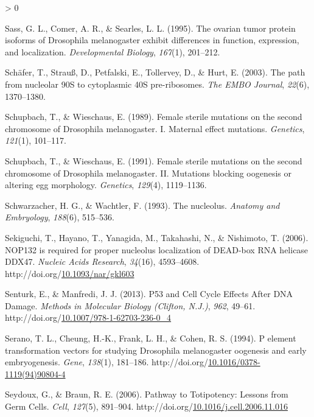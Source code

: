 \documentclass[12pt,oneside]{reedthesis}
\newlength{\cslhangindent}
\newenvironment{CSLReferences}[2] %
 {%
  \setlength{\parindent}{0pt}
  \ifodd #1 \everypar{\setlength{\hangindent}{\cslhangindent}}\ignorespaces\fi
  \ifnum #2 > 0
  \setlength{\parskip}{#2\baselineskip}
  \fi
 }%
 {}
\begin{document}
\begin{CSLReferences}{1}{0}
\leavevmode\hypertarget{ref-Sass1995}{}%
Sass, G. L., Comer, A. R., \& Searles, L. L. (1995). The ovarian tumor protein isoforms of {Drosophila} melanogaster exhibit differences in function, expression, and localization. \emph{Developmental Biology}, \emph{167}(1), 201--212.

\leavevmode\hypertarget{ref-Schafer2003a}{}%
Schäfer, T., Strauß, D., Petfalski, E., Tollervey, D., \& Hurt, E. (2003). The path from nucleolar {90S} to cytoplasmic {40S} pre-ribosomes. \emph{The EMBO Journal}, \emph{22}(6), 1370--1380.

\leavevmode\hypertarget{ref-Schupbach1989c}{}%
Schupbach, T., \& Wieschaus, E. (1989). Female sterile mutations on the second chromosome of {Drosophila} melanogaster. {I}. {Maternal} effect mutations. \emph{Genetics}, \emph{121}(1), 101--117.

\leavevmode\hypertarget{ref-Schupbach1991f}{}%
Schupbach, T., \& Wieschaus, E. (1991). Female sterile mutations on the second chromosome of {Drosophila} melanogaster. {II}. {Mutations} blocking oogenesis or altering egg morphology. \emph{Genetics}, \emph{129}(4), 1119--1136.

\leavevmode\hypertarget{ref-Schwarzacher1993}{}%
Schwarzacher, H. G., \& Wachtler, F. (1993). The nucleolus. \emph{Anatomy and Embryology}, \emph{188}(6), 515--536.

\leavevmode\hypertarget{ref-sekiguchiNOP132RequiredProper2006}{}%
Sekiguchi, T., Hayano, T., Yanagida, M., Takahashi, N., \& Nishimoto, T. (2006). {NOP132} is required for proper nucleolus localization of {DEAD}-box {RNA} helicase {DDX47}. \emph{Nucleic Acids Research}, \emph{34}(16), 4593--4608. http://doi.org/\href{https://doi.org/10.1093/nar/gkl603}{10.1093/nar/gkl603}

\leavevmode\hypertarget{ref-senturkP53CellCycle2013}{}%
Senturk, E., \& Manfredi, J. J. (2013). P53 and {Cell Cycle Effects After DNA Damage}. \emph{Methods in Molecular Biology (Clifton, N.J.)}, \emph{962}, 49--61. http://doi.org/\href{https://doi.org/10.1007/978-1-62703-236-0_4}{10.1007/978-1-62703-236-0\_4}

\leavevmode\hypertarget{ref-seranoElementTransformationVectors1994}{}%
Serano, T. L., Cheung, H.-K., Frank, L. H., \& Cohen, R. S. (1994). P element transformation vectors for studying {Drosophila} melanogaster oogenesis and early embryogenesis. \emph{Gene}, \emph{138}(1), 181--186. http://doi.org/\href{https://doi.org/10.1016/0378-1119(94)90804-4}{10.1016/0378-1119(94)90804-4}

\leavevmode\hypertarget{ref-Seydoux2006}{}%
Seydoux, G., \& Braun, R. E. (2006). Pathway to {Totipotency}: {Lessons} from {Germ Cells}. \emph{Cell}, \emph{127}(5), 891--904. http://doi.org/\href{https://doi.org/10.1016/j.cell.2006.11.016}{10.1016/j.cell.2006.11.016}


\end{CSLReferences}
\end{document}
